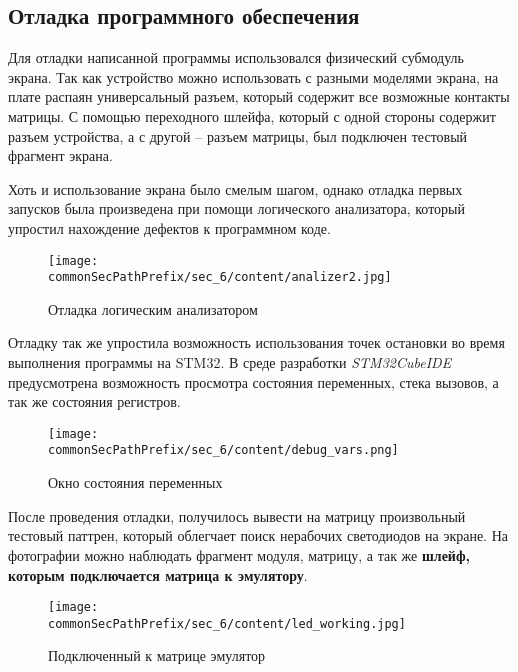 \subsection{Отладка программного обеспечения}

Для отладки написанной программы использовался физический субмодуль экрана. Так как устройство можно использовать с разными моделями экрана, на плате распаян универсальный разъем, который содержит все возможные контакты матрицы. С помощью переходного шлейфа, который с одной стороны содержит разъем устройства, а с другой -- разъем матрицы, был подключен тестовый фрагмент экрана. 

Хоть и использование экрана было смелым шагом, однако отладка первых запусков была произведена при помощи логического анализатора, который упростил нахождение дефектов к программном коде.

\begin{figure}[ht]
    \centering
    \texttt{[image: \\commonSecPathPrefix/sec\_6/content/analizer2.jpg]}
    \caption{Отладка логическим анализатором}
\end{figure}

Отладку так же упростила возможность использования точек остановки во время выполнения программы на STM32. В среде разработки \textit{STM32CubeIDE} предусмотрена возможность просмотра состояния переменных, стека вызовов, а так же состояния регистров.

\begin{figure}[ht]
    \centering
    \texttt{[image: \\commonSecPathPrefix/sec\_6/content/debug\_vars.png]}
    \caption{Окно состояния переменных}
\end{figure}

После проведения отладки, получилось вывести на матрицу произвольный тестовый паттрен, который облегчает поиск нерабочих светодиодов на экране. На фотографии можно наблюдать фрагмент модуля, матрицу, а так же \textbf{шлейф, которым подключается матрица к эмулятору}.

\begin{figure}[ht]
    \centering
    \texttt{[image: \\commonSecPathPrefix/sec\_6/content/led\_working.jpg]}
    \caption{Подключенный к матрице эмулятор}
\end{figure}